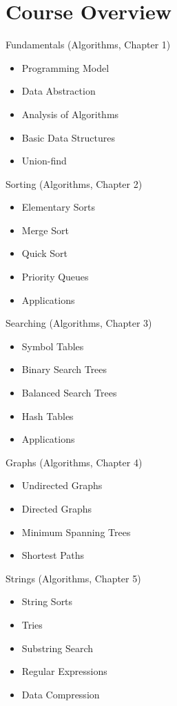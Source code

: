 \documentclass[8pt,a4paper,compress]{beamer}
\begin{document}
\section{Course Overview}

\begin{frame}[fragile]
\pause

Fundamentals (Algorithms, Chapter 1)
\begin{itemize}
\item Programming Model
\item Data Abstraction
\item Analysis of Algorithms
\item Basic Data Structures
\item Union-find
\end{itemize}

\pause
\bigskip

Sorting (Algorithms, Chapter 2)
\begin{itemize}
\item Elementary Sorts
\item Merge Sort
\item Quick Sort
\item Priority Queues
\item Applications
\end{itemize}
\end{frame}

\begin{frame}[fragile]
\pause

Searching (Algorithms, Chapter 3)
\begin{itemize}
\item Symbol Tables
\item Binary Search Trees
\item Balanced Search Trees
\item Hash Tables
\item Applications
\end{itemize}

\pause
\bigskip

Graphs (Algorithms, Chapter 4)
\begin{itemize}
\item Undirected Graphs
\item Directed Graphs
\item Minimum Spanning Trees
\item Shortest Paths
\end{itemize}

\pause
\bigskip

Strings (Algorithms, Chapter 5)
\begin{itemize}
\item String Sorts
\item Tries
\item Substring Search
\item Regular Expressions
\item Data Compression
\end{itemize}
\end{frame}
\end{document}
